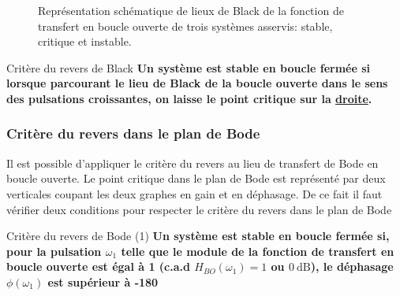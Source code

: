 \begin{figure}[!h]
\begin{center}
\end{center}
\caption{Représentation schématique de lieux de Black de la 
    fonction de transfert en boucle ouverte de trois systèmes 
    asservis: stable, critique et instable.
\label{fig-black_revers}}
\end{figure}

\begin{criteria}{Critère du revers de Black}
\textbf{Un système est stable en boucle fermée si lorsque parcourant 
        le lieu de Black de la boucle ouverte dans le sens des 
        pulsations croissantes, on laisse le point critique sur la \underline{droite}.}
\end{criteria}
\newpage
\subsubsection{Critère du revers dans le plan de Bode}

Il est possible d'appliquer le critère du revers au lieu de transfert de Bode
en boucle ouverte. Le point critique
dans le plan de Bode est représenté par deux verticales coupant les deux graphes en gain et en déphasage.
De ce fait il faut vérifier deux conditions pour respecter le critère du revers dans le plan de Bode

\begin{criteria}{Critère du revers de Bode (1)}
\textbf{Un système est stable en boucle fermée si, pour la pulsation $\omega_{1}$ telle que le module 
    de la fonction de transfert en boucle ouverte est égal à 1 (c.a.d $H_{BO}(\omega_{1})=1$ 
    ou $\SI{0}{\dB}$), le déphasage $\phi(\omega_1)$ est supérieur à -180\degree}
\end{criteria}

